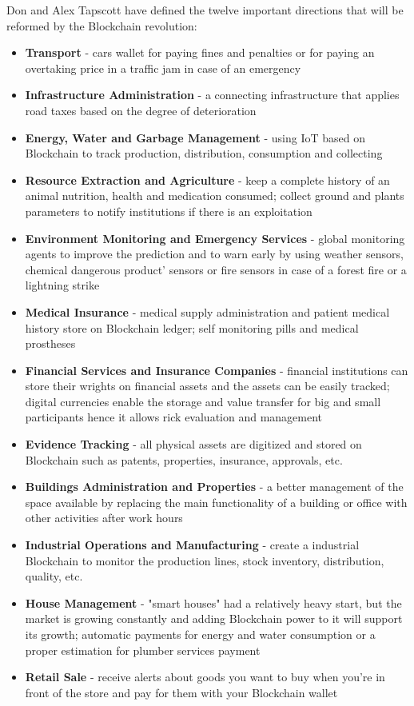 Don and Alex Tapscott \cite{tapscott} have defined the twelve important directions that will be reformed by the Blockchain revolution:
\begin{itemize}
	\item \textbf{Transport} - cars wallet for paying fines and penalties or for paying an overtaking price in a traffic jam in case of an emergency
	\item \textbf{Infrastructure Administration} - a connecting infrastructure that applies road taxes based on the degree of deterioration
	\item \textbf{Energy, Water and Garbage Management} - using IoT based on Blockchain to track production, distribution, consumption and collecting
	\item \textbf{Resource Extraction and Agriculture} - keep a complete history of an animal nutrition, health and medication consumed; collect ground and plants parameters to notify institutions if there is an exploitation
	\item \textbf{Environment Monitoring and Emergency Services} - global monitoring agents to improve the prediction and to warn early by using weather sensors, chemical dangerous product' sensors or fire sensors in case of a forest fire or a lightning strike
	\item \textbf{Medical Insurance} - medical supply administration and patient medical history store on Blockchain ledger; self monitoring pills and medical prostheses
	\item \textbf{Financial Services and Insurance Companies} - financial institutions can store their wrights on financial assets and the assets can be easily tracked; digital currencies enable the storage and value transfer for big and small participants hence it allows rick evaluation and management
	\item \textbf{Evidence Tracking} - all physical assets are digitized and stored on Blockchain such as patents, properties, insurance, approvals, etc.
	\item \textbf{Buildings Administration and Properties} - a better management of the space available by replacing the main functionality of a building or office with other activities after work hours 
	\item \textbf{Industrial Operations and  Manufacturing} - create a industrial Blockchain to monitor the production lines, stock inventory, distribution, quality, etc.
	\item \textbf{House Management} - "smart houses" had a relatively heavy start, but the market is growing constantly and adding Blockchain power to it will support its growth; automatic payments for energy and water consumption or a proper estimation for plumber services payment
	\item \textbf{Retail Sale} - receive alerts about goods you want to buy when you're in front of the store and pay for them with your Blockchain wallet
\end{itemize} 

